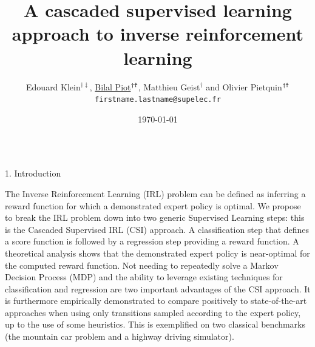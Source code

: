 \documentclass[xcolor=x11names,12pt]{beamer}
\title{\Large{A cascaded supervised learning approach to inverse reinforcement learning}}
\author{{Edouard Klein}$^{\dag\ddag}$, \underline{Bilal Piot}$^{\dag\textrm{\Ankh}}$, Matthieu Geist$^\dag$ and Olivier Pietquin$^{\dag\textrm{\Ankh}}$\\\texttt{firstname.lastname@supelec.fr}}
\date{\today}
\institute[Supélec]{$\dag$Equipe IMS/MaLIS (Supélec), France\\$\ddag$Equipe ABC UMR 7503 (Loria-CNRS), France\\\Ankh UMI 2958 (GeorgiaTech-CNRS)}
\newenvironment{WholeWidthBox}[1]{
  \begin{columns}
    \begin{column}{0.98\textwidth}
      \begin{block}{#1}
        \begin{hfill}
}{
        \end{hfill}
      \end{block}
    \end{column}
  \end{columns}
}
\begin{document}
\begin{frame}

\begin{WholeWidthBox}{1. Introduction}
The Inverse Reinforcement Learning (IRL) problem can be defined as inferring a reward function for which a demonstrated expert policy is optimal.
We propose to break the IRL problem down into two generic Supervised Learning steps: this is the Cascaded Supervised IRL (CSI) approach. A classification step that defines a score function is followed by a regression step providing a reward function.
A theoretical analysis shows that the demonstrated expert policy is near-optimal for the computed reward function.
Not needing to repeatedly solve a Markov Decision Process (MDP) and the ability to leverage existing techniques for classification and regression are two important advantages of the CSI approach. It is furthermore empirically demonstrated to compare positively to state-of-the-art approaches when using only transitions sampled according to the expert policy, up to the use of some heuristics. This is exemplified on two classical benchmarks (the mountain car problem and a highway driving simulator).
\end{WholeWidthBox}

\vfill


\end{frame}
\end{document}
